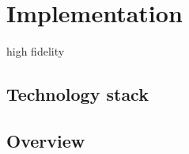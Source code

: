 \section{Implementation}
    
high fidelity

    \subsection{Technology stack}

    \subsection{Overview}